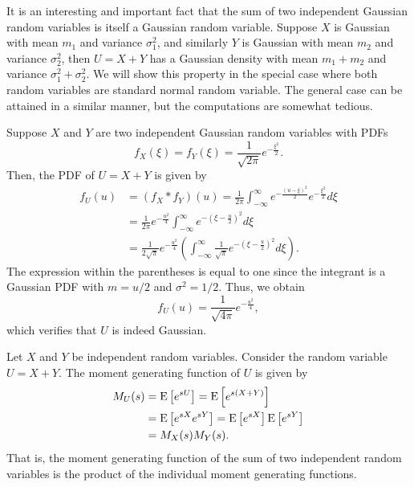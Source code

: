\begin{example}
It is an interesting and important fact that the sum of two independent Gaussian random variables is itself a Gaussian random variable.
Suppose $X$ is Gaussian with mean $m_1$ and variance $\sigma_1^2$, and similarly $Y$ is Gaussian with mean $m_2$ and variance $\sigma_2^2$, then $U = X + Y$ has a Gaussian density with mean $m_1 + m_2$ and variance $\sigma_1^2 + \sigma_2^2$.
We will show this property in the special case where both random variables are standard normal random variable.
The general case can be attained in a similar manner, but the computations are somewhat tedious.

Suppose $X$ and $Y$ are two independent Gaussian random variables with PDFs
\begin{equation*}
f_X(\xi) = f_Y(\xi) = \frac 1{\sqrt{2\pi}} e^{-\frac{\xi^2}{2}} .
\end{equation*}
Then, the PDF of $U = X + Y$ is given by
\begin{equation*}
\begin{split}
f_U (u) &= (f_X \ast f_Y) (u)
= \frac{1}{2\pi}
\int_{-\infty}^{\infty} e^{-\frac{(u - \xi)^2}{2}} e^{-\frac{\xi^2}{2}} d\xi \\
&= \frac{1}{2\pi} e^{- \frac{u^2}{4}}
\int_{-\infty}^{\infty} e^{- \left( \xi - \frac{u}{2} \right)^2} d\xi \\
&= \frac{1}{2 \sqrt{\pi}} e^{- \frac{u^2}{4}}
\left( \int_{-\infty}^{\infty} \frac{1}{\sqrt{\pi}}
e^{-\left( \xi - \frac{u}{2} \right)^2} d\xi \right) .
\end{split}
\end{equation*}
The expression within the parentheses is equal to one since the integrant is a Gaussian PDF with $m = u/2$ and $\sigma^2 = 1/2$.
Thus, we obtain
\begin{equation*}
f_U(u) = \frac{1}{\sqrt{4\pi}} e^{-\frac{u^2}{4}} ,
\end{equation*}
which verifies that $U$ is indeed Gaussian.
\end{example}

Let $X$ and $Y$ be independent random variables.
Consider the random variable $U = X + Y$.
The moment generating function of $U$ is given by
\begin{equation*}
\begin{split}
M_U (s) &= \mathrm{E} \left[ e^{sU} \right]
= \mathrm{E} \left[ e^{s(X + Y)} \right] \\
&= \mathrm{E} \left[ e^{sX} e^{sY} \right]
= \mathrm{E} \left[ e^{sX} \right] \mathrm{E} \left[ e^{sY} \right] \\
&= M_X(s) M_Y(s) .
\end{split}
\end{equation*}
That is, the moment generating function of the sum of two independent random variables is the product of the individual moment generating functions.

